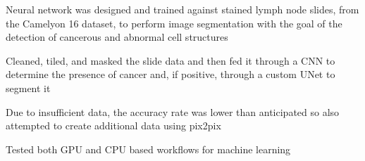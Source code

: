 \documentclass[letterpaper]{resume}
\begin{document}
% 


\begin{compactitem}
\item Neural network was designed and trained against stained lymph node slides, from the Camelyon 16 dataset, to perform image segmentation with the goal of the detection of cancerous and abnormal cell structures
\item Cleaned, tiled, and masked the slide data and then fed it through a CNN to determine the presence of cancer and, if positive, through a custom UNet to segment it
\item Due to insufficient data, the accuracy rate was lower than anticipated so also attempted to create additional data using pix2pix
\item Tested both GPU and CPU based workflows for machine learning
\end{compactitem}
\end{document}
